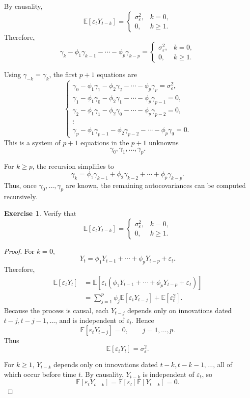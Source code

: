 \documentclass[12pt,oneside]{book}
\numberwithin{equation}{section}
\theoremstyle{definition}
\newtheorem{exercise}{Exercise}[section]
\theoremstyle{plain}
\theoremstyle{remark}
\newcommand{\E}{\mathbb{E}}
\begin{document}
By causality,
\[
\E[\varepsilon_tY_{t-k}]
=
\begin{cases}
\sigma_\varepsilon^2, & k=0,\\
0, & k\geq 1.
\end{cases}
\]
Therefore,
\[
\gamma_k-\phi_1\gamma_{k-1}-\cdots-\phi_p\gamma_{k-p}
=
\begin{cases}
\sigma_\varepsilon^2, & k=0,\\
0, & k\geq 1.
\end{cases}
\]

Using $\gamma_{-k}=\gamma_k$, the first $p+1$ equations are
\[
\begin{cases}
\gamma_0-\phi_1\gamma_1-\phi_2\gamma_2-\cdots-\phi_p\gamma_p
=
\sigma_\varepsilon^2, \\
\gamma_1-\phi_1\gamma_0-\phi_2\gamma_1-\cdots-\phi_p\gamma_{p-1}
=
0, \\
\gamma_2-\phi_1\gamma_1-\phi_2\gamma_0-\cdots-\phi_p\gamma_{p-2}
=
0, \\
\vdots \\
\gamma_p-\phi_1\gamma_{p-1}-\phi_2\gamma_{p-2}-\cdots-\phi_p\gamma_0
=
0.
\end{cases}
\]
This is a system of $p+1$ equations in the $p+1$ unknowns
\[
\gamma_0,\gamma_1,\ldots,\gamma_p.
\]

For $k\geq p$, the recursion simplifies to
\[
\gamma_k
=
\phi_1\gamma_{k-1}
+
\phi_2\gamma_{k-2}
+\cdots+
\phi_p\gamma_{k-p}.
\]
Thus, once $\gamma_0,\ldots,\gamma_p$ are known, the remaining autocovariances can be computed recursively.

\begin{exercise}
Verify that
\[
\E[\varepsilon_tY_{t-k}]
=
\begin{cases}
\sigma_\varepsilon^2, & k=0,\\
0, & k\geq 1.
\end{cases}
\]
\end{exercise}

\begin{proof}
For $k=0$,
\[
Y_t
=
\phi_1Y_{t-1}
+\cdots+
\phi_pY_{t-p}
+\varepsilon_t.
\]
Therefore,
\begin{align*}
\E[\varepsilon_tY_t]
&=
\E\left[
\varepsilon_t
\left(
\phi_1Y_{t-1}
+\cdots+
\phi_pY_{t-p}
+\varepsilon_t
\right)
\right] \\
&=
\sum_{j=1}^p\phi_j\E[\varepsilon_tY_{t-j}]
+
\E[\varepsilon_t^2].
\end{align*}
Because the process is causal, each $Y_{t-j}$ depends only on innovations dated $t-j,t-j-1,\ldots$, and is independent of $\varepsilon_t$. Hence
\[
\E[\varepsilon_tY_{t-j}]=0,
\qquad j=1,\ldots,p.
\]
Thus
\[
\E[\varepsilon_tY_t]=\sigma_\varepsilon^2.
\]

For $k\geq 1$, $Y_{t-k}$ depends only on innovations dated $t-k,t-k-1,\ldots$, all of which occur before time $t$. By causality, $Y_{t-k}$ is independent of $\varepsilon_t$, so
\[
\E[\varepsilon_tY_{t-k}]
=
\E[\varepsilon_t]\E[Y_{t-k}]
=
0.
\]
\end{proof}
\end{document}

